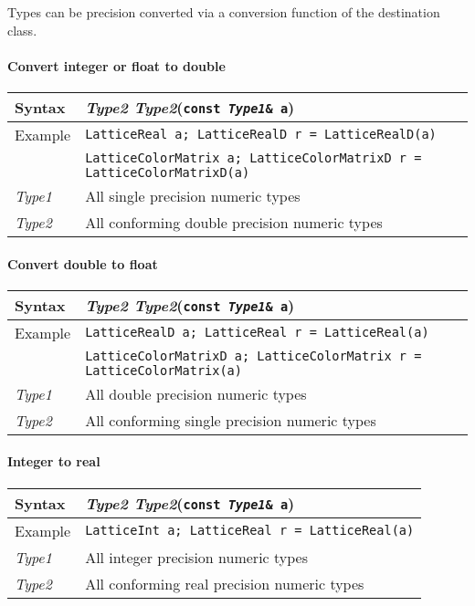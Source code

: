 \documentclass[12pt,letterpaper]{article}
\newcommand{\tLatticeReal}{LatticeReal}
\newcommand{\tLatticeInt}{LatticeInt}
\newcommand{\tLatticeColorMatrix}{LatticeColorMatrix}
\newcommand{\tLatticeRealD}{LatticeRealD}
\newcommand{\tLatticeColorMatrixD}{LatticeColorMatrixD}
\begin{document}
Types can be precision converted via a conversion function of the destination
class.

\paragraph{Convert integer or float to double}
\begin{flushleft}
  \begin{tabular}{|l|l|}
  \hline
  Syntax      & {\it Type2 Type2}({\tt const {\it Type1}\& a}) \\
  \hline
  Example     & {\tt \tLatticeReal{} a; \tLatticeRealD{} r = \tLatticeRealD(a)} \\
              & {\tt \tLatticeColorMatrix{} a; \tLatticeColorMatrixD{} r = \tLatticeColorMatrixD(a)} \\
  \hline
  {\it Type1} & All single precision numeric types \\
  {\it Type2} & All conforming double precision numeric types \\
  \hline
  \end{tabular}
\end{flushleft}

\paragraph{Convert double to float}
\begin{flushleft}
  \begin{tabular}{|l|l|}
  \hline
  Syntax      & {\it Type2 Type2}({\tt const {\it Type1}\& a})\\
  \hline
  Example     & {\tt \tLatticeRealD{} a; \tLatticeReal{} r = \tLatticeReal(a)} \\
              & {\tt \tLatticeColorMatrixD{} a; \tLatticeColorMatrix{} r = \tLatticeColorMatrix(a)} \\
  \hline
  {\it Type1} & All double precision numeric types \\
  {\it Type2} & All conforming single precision numeric types \\
  \hline
  \end{tabular}
\end{flushleft}

\paragraph{Integer to real}

\begin{flushleft}
  \begin{tabular}{|l|l|}
  \hline
  Syntax      & {\it Type2 Type2}({\tt const {\it Type1}\& a})\\
  \hline
  Example     & {\tt \tLatticeInt{} a; \tLatticeReal{} r = \tLatticeReal(a)} \\
  \hline
  {\it Type1} & All integer precision numeric types \\
  {\it Type2} & All conforming real precision numeric types \\
  \hline
  \end{tabular}
\end{flushleft}
\end{document}

